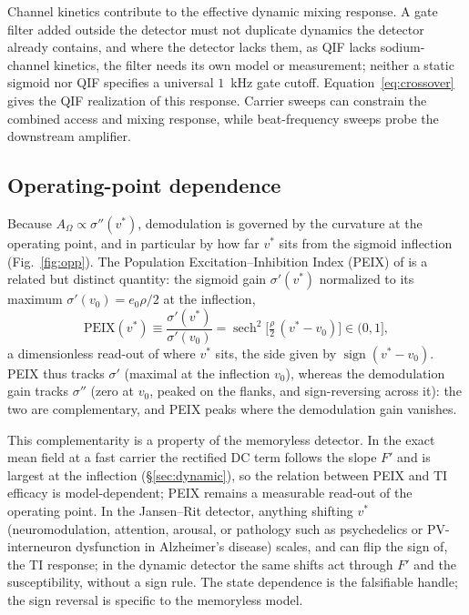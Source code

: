 \documentclass[11pt,a4paper]{article}
\newcommand{\Sig}{\sigma}
\begin{document}
Channel kinetics contribute to the effective dynamic mixing response. A gate
filter added outside the detector must not duplicate dynamics the detector already
contains, and where the detector lacks them, as QIF lacks sodium-channel kinetics,
the filter needs its own model or measurement; neither a static sigmoid nor QIF
specifies a universal $1$~kHz gate cutoff.
Equation~\eqref{eq:crossover} gives the QIF realization of this response.
Carrier sweeps can constrain the
combined access and mixing response, while beat-frequency sweeps probe the
downstream amplifier.

\subsection{Operating-point dependence}\label{sec:opp}
Because $A_\Omega\propto\Sig''(v^*)$, demodulation is governed by the curvature at
the operating point, and in particular by how far $v^*$ sits from the sigmoid
inflection (Fig.~\ref{fig:opp}). The Population Excitation--Inhibition Index (PEIX)
of \cite{ruffini2025cfc} is a related but distinct quantity: the sigmoid gain
$\Sig'(v^*)$ normalized to its maximum $\Sig'(v_0)=e_0 \rho/2$ at the inflection,
\begin{equation}
\mathrm{PEIX}(v^*)\equiv\frac{\Sig'(v^*)}{\Sig'(v_0)}
=\operatorname{sech}^2\!\Big[\tfrac{\rho}{2}\,(v^*-v_0)\Big]\in(0,1],
\label{eq:peix}
\end{equation}
a dimensionless read-out of where $v^*$ sits, the side given by
$\operatorname{sign}(v^*-v_0)$. PEIX thus tracks $\Sig'$ (maximal at the inflection
$v_0$), whereas the demodulation gain tracks $\Sig''$ (zero at $v_0$, peaked on the
flanks, and sign-reversing across it): the two are complementary, and PEIX peaks
where the demodulation gain vanishes.

This complementarity is a property of the memoryless detector. In the exact mean field at a fast carrier the rectified DC term
follows the slope $F'$ and is largest at the inflection (\S\ref{sec:dynamic}), so the
relation between PEIX and TI efficacy is model-dependent; PEIX remains a measurable
read-out of the operating point. In the Jansen--Rit detector, anything shifting $v^*$
(neuromodulation, attention, arousal, or pathology such as psychedelics or PV-interneuron
dysfunction in Alzheimer's disease) scales, and can flip the sign of, the TI response; in
the dynamic detector the same shifts act through $F'$ and the susceptibility, without a
sign rule. The state dependence is the falsifiable handle; the sign reversal is specific
to the memoryless model.
\end{document}
